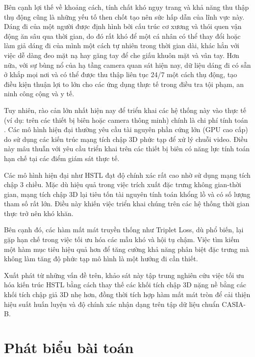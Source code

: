 Bên cạnh lợi thế về khoảng cách, tính chất khó ngụy trang và khả năng thu thập thụ động cũng là những yếu tố then chốt tạo nên sức hấp dẫn của lĩnh vực này. Dáng đi của một người được định hình bởi cấu trúc cơ xương và thói quen vận động ăn sâu qua thời gian, do đó rất khó để một cá nhân có thể thay đổi hoặc làm giả dáng đi của mình một cách tự nhiên trong thời gian dài, khác hẳn với việc dễ dàng đeo mặt nạ hay găng tay để che giấu khuôn mặt và vân tay. Hơn nữa, với sự bùng nổ của hạ tầng camera quan sát hiện nay, dữ liệu dáng đi có sẵn ở khắp mọi nơi và có thể được thu thập liên tục 24/7 một cách thụ động, tạo điều kiện thuận lợi to lớn cho các ứng dụng thực tế trong điều tra tội phạm, an ninh công cộng và y tế.

Tuy nhiên, rào cản lớn nhất hiện nay để triển khai các hệ thống này vào thực tế (ví dụ: trên các thiết bị biên hoặc camera thông minh) chính là chi phí tính toán \cite{hstl}. Các mô hình hiện đại thường yêu cầu tài nguyên phần cứng lớn (GPU cao cấp) do sử dụng các kiến trúc mạng tích chập 3D phức tạp để xử lý chuỗi video. Điều này mâu thuẫn với yêu cầu triển khai trên các thiết bị biên có năng lực tính toán hạn chế tại các điểm giám sát thực tế.

Các mô hình hiện đại như HSTL \cite{hstl} đạt độ chính xác rất cao nhờ sử dụng mạng tích chập 3 chiều. Mặc dù hiệu quả trong việc trích xuất đặc trưng không gian-thời gian, mạng tích chập 3D lại tiêu tốn tài nguyên tính toán khổng lồ và có số lượng tham số rất lớn. Điều này khiến việc triển khai chúng trên các hệ thống thời gian thực trở nên khó khăn.

Bên cạnh đó, các hàm mất mát truyền thống như Triplet Loss, dù phổ biến, lại gặp hạn chế trong việc tối ưu hóa các mẫu khó và hội tụ chậm. Việc tìm kiếm một hàm mục tiêu hiệu quả hơn để tăng cường khả năng phân biệt đặc trưng mà không làm tăng độ phức tạp mô hình là một hướng đi cần thiết.

Xuất phát từ những vấn đề trên, khảo sát này tập trung nghiên cứu việc tối ưu hóa kiến trúc HSTL bằng cách thay thế các khối tích chập 3D nặng nề bằng các khối tích chập giả 3D nhẹ hơn, đồng thời tích hợp hàm mất mát tròn để cải thiện hiệu suất huấn luyện và độ chính xác nhận dạng trên tập dữ liệu chuẩn CASIA-B.

\section{Phát biểu bài toán}

